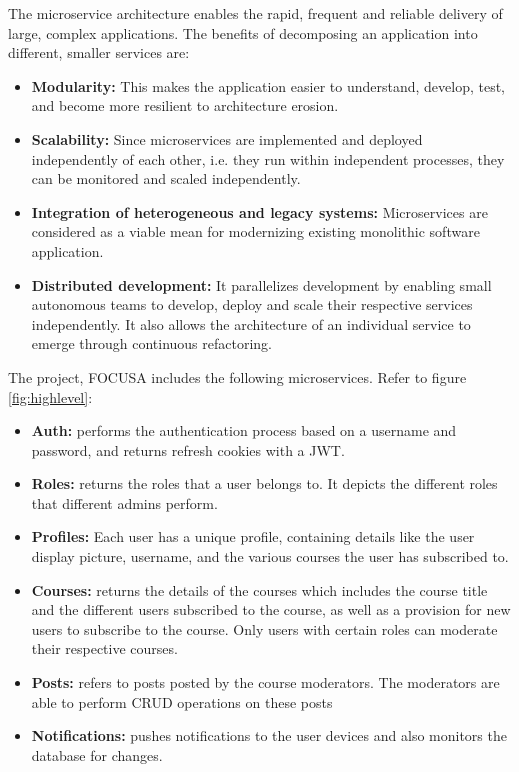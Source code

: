 The microservice architecture enables the rapid, frequent and reliable delivery of large, complex applications.
The benefits of decomposing an application into different, smaller services are:
\begin{itemize}
    \item \textbf{Modularity:} This makes the application easier to understand, develop, test, and 
    become more resilient to architecture erosion.
    \item \textbf{Scalability:} Since microservices are implemented and deployed independently of 
    each other, i.e. they run within independent processes, they can be monitored and scaled independently.
    \item \textbf{Integration of heterogeneous and legacy systems:} Microservices are considered as a 
    viable mean for modernizing existing monolithic software application.
    \item \textbf{Distributed development:} It parallelizes development by enabling small autonomous teams to
    develop, deploy and scale their respective services independently. It also allows the architecture of 
    an individual service to emerge through continuous refactoring.
\end{itemize}

The project, FOCUSA includes the following microservices. Refer to figure \ref{fig:highlevel}:
\begin{itemize}
    \item \textbf{Auth:} performs the authentication process based on a username and password, and returns refresh cookies with a JWT.
    \item \textbf{Roles:}  returns the roles that a user belongs to. It depicts the different roles that different admins perform.
    \item \textbf{Profiles:} Each user has a unique profile, containing details like the user display picture, username, and the various courses the user has subscribed to.
    \item \textbf{Courses:}  returns the details of the courses which includes the course title and the different users subscribed to the course, as well as a provision for new users to subscribe to the course. Only users with certain roles can moderate their respective courses.
    \item \textbf{Posts:} refers to posts posted by the course moderators. The moderators are able to perform CRUD operations on these posts
    \item \textbf{Notifications:}  pushes notifications to the user devices and also monitors the database for changes.
\end{itemize}

